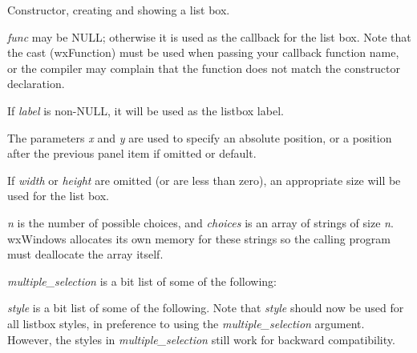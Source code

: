 Constructor, creating and showing a list box.

{\it func} may be NULL; otherwise it is used as the callback for the
list box.  Note that the cast (wxFunction) must be used when passing
your callback function name, or the compiler may complain that the
function does not match the constructor declaration.

If {\it label} is non-NULL, it will be used as the listbox label.

The parameters {\it x} and {\it y} are used to specify an absolute
position, or a position after the previous panel item if omitted or
default.

If {\it width} or {\it height} are omitted (or are less than zero), an
appropriate size will be used for the list box.

{\it n} is the number of possible choices, and {\it choices} is an array of strings
of size {\it n}. wxWindows allocates its own memory for these strings so the
calling program must deallocate the array itself.

{\it multiple\_selection} is a bit list of some of the following:

\begin{twocollist}\itemsep=0pt
\end{twocollist}

{\it style} is a bit list of some of the following. Note that {\it style} should now
be used for all listbox styles, in preference to using the {\it multiple\_selection} argument.
However, the styles in {\it multiple\_selection} still work for backward compatibility.

\begin{twocollist}\itemsep=0pt
\end{twocollist}

